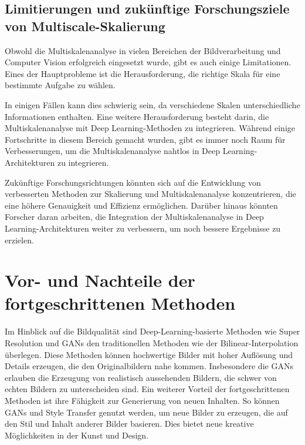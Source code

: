     \subsection{Limitierungen und zukünftige Forschungsziele von Multiscale-Skalierung}
        Obwohl die Multiskalenanalyse in vielen Bereichen der Bildverarbeitung und Computer Vision erfolgreich eingesetzt wurde, gibt es auch einige Limitationen.  
        Eines der Hauptprobleme ist die Herausforderung, die richtige Skala für eine bestimmte Aufgabe zu wählen.      

        
        In einigen Fällen kann dies schwierig sein, da verschiedene Skalen unterschiedliche Informationen enthalten.
        Eine weitere Herausforderung besteht darin, die Multiskalenanalyse mit Deep Learning-Methoden zu integrieren.      
        Während einige Fortschritte in diesem Bereich gemacht wurden, gibt es immer noch Raum für Verbesserungen, um die Multiskalenanalyse nahtlos in Deep Learning-Architekturen zu integrieren.
        
        Zukünftige Forschungsrichtungen könnten sich auf die Entwicklung von verbesserten Methoden zur Skalierung und Multiskalenanalyse konzentrieren, die eine höhere Genauigkeit und Effizienz ermöglichen.      
        Darüber hinaus könnten Forscher daran arbeiten, die Integration der Multiskalenanalyse in Deep Learning-Architekturen weiter zu verbessern, um noch bessere Ergebnisse zu erzielen.

\section{Vor- und Nachteile der fortgeschrittenen Methoden}

    Im Hinblick auf die Bildqualität sind Deep-Learning-basierte Methoden wie Super Resolution und GANs den traditionellen Methoden wie der Bilinear-Interpolation überlegen.      
    Diese Methoden können hochwertige Bilder mit hoher Auflösung und Details erzeugen, die den Originalbildern nahe kommen.      
    Insbesondere die GANs erlauben die Erzeugung von realistisch aussehenden Bildern, die schwer von echten Bildern zu unterscheiden sind.
    Ein weiterer Vorteil der fortgeschrittenen Methoden ist ihre Fähigkeit zur Generierung von neuen Inhalten.   
    So können GANs und Style Transfer genutzt werden, um neue Bilder zu erzeugen, die auf den Stil und Inhalt anderer Bilder basieren.      
    Dies bietet neue kreative Möglichkeiten in der Kunst und Design.


